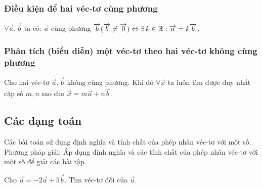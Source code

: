 \subsubsection*{Điều kiện để hai véc-tơ cùng phương}
$\forall \vec{a}, \vec{b}$ ta có: $\vec{a}$ cùng phương $\vec{b}(\vec{b}\ne\vec{0})\Leftrightarrow \exists\, k\in \Bbb{R} : \vec{a}=k\vec{b}$.
\subsubsection*{Phân tích (biểu diễn) một véc-tơ theo hai véc-tơ không cùng phương}
Cho hai véc-tơ $\vec{a}, \vec{b}$ không cùng phương. Khi đó $\forall \vec{x}$ ta luôn tìm được duy nhất cặp số $m, n$ sao cho $\vec{x}=m\vec{a}+n\vec{b}$.
\subsection{Các dạng toán}
\begin{dang}%
{Các bài toán sử dụng định nghĩa và tính chất của phép nhân véc-tơ với một số.}
Phương pháp giải: Áp dụng định nghĩa và các tính chất của phép nhân véc-tơ với một số để giải các bài tập.
\end{dang}
\begin{vd}%
Cho $\vec{u}=-2\vec{a}+5\vec{b}$. Tìm véc-tơ đối của $\vec{u}$.
\end{vd}
